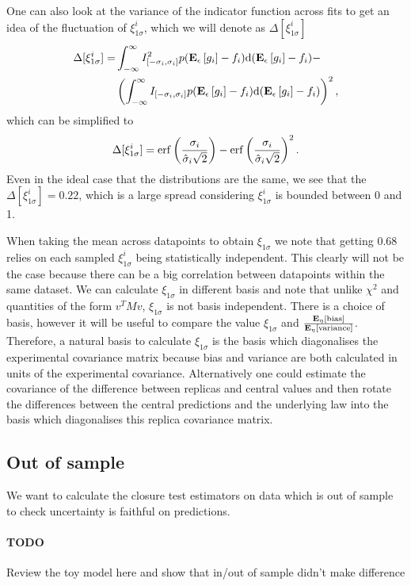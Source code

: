 One can also look at the variance of the indicator function across fits to
get an idea of the fluctuation of $\xi_{1\sigma}^{i}$, which we will denote
as $\Delta[\xi_{1\sigma}^{i}]$
\begin{equation}
    \begin{split}
        \Delta[\xi_{1\sigma}^{i}] =& \int_{-\infty}^{\infty} I_{[-\sigma_i, \sigma_i]}^2
        p(\mathbf{E}_{\epsilon}\left[ g_i \right] - f_i)
    {\rm d}(\mathbf{E}_{\epsilon}\left[ g_i \right] - f_i) - \\
    &\left( \int_{-\infty}^{\infty} I_{[-\sigma_i, \sigma_i]}
    p(\mathbf{E}_{\epsilon}\left[ g_i \right] - f_i)
    {\rm d}(\mathbf{E}_{\epsilon}\left[ g_i \right] - f_i) \right)^2,
    \end{split}
\end{equation}
which can be simplified to
\begin{equation}
    \Delta[\xi_{1\sigma}^{i}] =
    {\rm erf} \left( \frac{\sigma_i}{\hat{\sigma}_i \sqrt{2}}\right) -
    {\rm erf} \left( \frac{\sigma_i}{\hat{\sigma}_i \sqrt{2}}\right)^2.
\end{equation}
Even in the ideal case that the distributions are the same, we see that the
$\Delta[\xi_{1\sigma}^{i}] = 0.22$, which is a large spread considering
$\xi_{1\sigma}^{i}$ is bounded between 0 and 1.

When taking the mean across datapoints to obtain $\xi_{1\sigma}$ we note that
getting 0.68 relies on each sampled $\xi_{1\sigma}^{i}$ being statistically
independent. This clearly will not be the case because there can be a big correlation
between datapoints within the same dataset. We can calculate $\xi_{1\sigma}$
in different basis and note that unlike $\chi^2$ and quantities of the form
$v^T M v$, $\xi_{1\sigma}$ is
not basis independent. There is a choice of basis, however it will be useful to
compare the value $\xi_{1\sigma}$ and $\frac{\mathbf{E}_{\eta}\left[ {\rm bias} \right]}{\mathbf{E}_{\eta}\left[ {\rm variance} \right]}$.
Therefore, a natural basis to calculate
$\xi_{1\sigma}$ is the basis which diagonalises the experimental covariance matrix
because bias and variance are both calculated in units of the experimental
covariance. Alternatively one could estimate the covariance of the difference
between replicas and central values and then rotate the differences between
the central predictions and the underlying law into the basis which diagonalises
this replica covariance matrix.

\subsection{Out of sample}

We want to calculate the closure test estimators on data which is out of sample
to check uncertainty is faithful on predictions.

\paragraph{TODO}{Review the toy model here and show that in/out of sample
didn't make difference}
